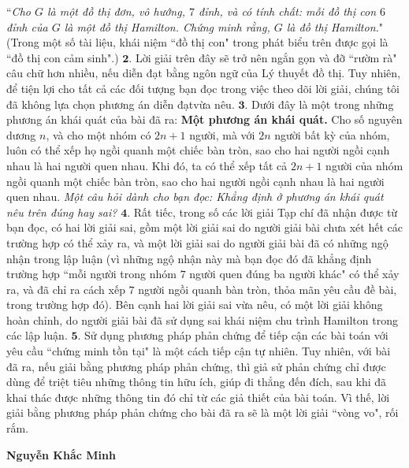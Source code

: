 \begin{multicols}{2}
	\vskip 0.05cm
	``\textit{Cho $G$ là một đồ thị đơn, vô hướng, $7$ đỉnh, và có tính chất: mỗi đồ thị con $6$ đỉnh của $G$ là một đồ thị Hamilton. Chứng minh rằng, $G$ là đồ thị Hamilton.}"
	\vskip 0.05cm
	(Trong một số tài liệu, khái niệm ``đồ thị con" trong phát biểu trên được gọi là ``đồ thị con cảm sinh".)
	\vskip 0.05cm
	$\pmb{2.}$ Lời giải trên đây sẽ trở nên ngắn gọn và đỡ ``rườm rà" câu chữ hơn nhiều, nếu diễn đạt bằng ngôn ngữ của Lý thuyết đồ thị. Tuy nhiên, để tiện lợi cho tất cả các đối tượng bạn đọc trong việc theo dõi lời giải, chúng tôi đã không lựa chọn phương án diễn đạt\linebreak vừa nêu.
	\vskip 0.05cm
	$\pmb{3.}$ Dưới đây là một trong những phương án khái quát của bài đã ra:
	\vskip 0.05cm
	\textbf{\color{thachthuctoanhoc}Một phương án khái quát.} Cho số nguyên dương $n$, và cho một nhóm có $2n + 1$ người, mà với $2n$ người bất kỳ của nhóm, luôn có thể xếp họ ngồi quanh một chiếc bàn tròn, sao cho hai người ngồi cạnh nhau là hai người quen nhau. Khi đó, ta có thể xếp tất cả $2n + 1$ người của nhóm ngồi quanh một chiếc bàn tròn, sao cho hai người ngồi cạnh nhau là hai người quen nhau.
	\vskip 0.05cm
	\textit{Một câu hỏi dành cho bạn đọc: Khẳng định ở phương án khái quát nêu trên đúng hay sai?}
	\vskip 0.05cm
	$\pmb{4.}$ Rất tiếc, trong số các lời giải Tạp chí đã nhận được từ bạn đọc, có hai lời giải sai, gồm một lời giải sai do người giải bài chưa xét hết các trường hợp có thể xảy ra, và một lời giải sai do người giải bài đã có những ngộ nhận trong lập luận (vì những ngộ nhận này mà bạn đọc đó đã khẳng định trường hợp ``mỗi người trong nhóm $7$ người quen đúng ba người khác" có thể xảy ra, và đã chỉ ra cách xếp $7$ người ngồi quanh bàn tròn, thỏa mãn yêu cầu đề bài, trong trường hợp đó). Bên cạnh hai lời giải sai vừa nêu, có một lời giải không hoàn chỉnh, do người giải bài đã sử dụng sai khái niệm chu trình Hamilton trong các lập luận.
	\vskip 0.05cm
	$\pmb{5.}$ Sử dụng phương pháp phản chứng để tiếp cận các bài toán với yêu cầu ``chứng minh tồn tại" là một cách tiếp cận tự nhiên. Tuy nhiên, với bài đã ra, nếu giải bằng phương pháp phản chứng, thì giả sử phản chứng chỉ được dùng để triệt tiêu những thông tin hữu ích, giúp đi thẳng đến đích, sau khi đã khai thác được những thông tin đó chỉ từ các giả thiết của bài toán. Vì thế, lời giải bằng phương pháp phản chứng cho bài đã ra sẽ là một lời giải ``vòng vo", rối rắm.
	\begin{flushright}
		\textbf{\color{thachthuctoanhoc}Nguyễn Khắc Minh}
	\end{flushright}	
	{}

\end{multicols}
